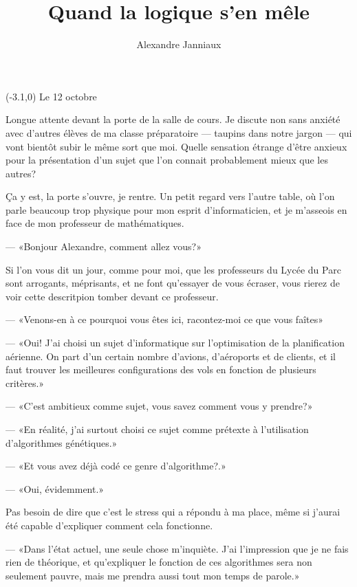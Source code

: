 \documentclass[letterpaper, 12pt]{report} %
\title{Quand la logique s'en mêle}
\author{Alexandre Janniaux}
\newcommand{\datemarge}[1]{%
    \begin{textblock}{3}(-3.1,0)
        #1
    \end{textblock}
}
\begin{document}
  \doublespacing{}

  \maketitle

  
  
  {
      \vspace{0pt}%
      \datemarge{Le 12 octobre}
Longue attente devant la porte de la salle de cours. 
Je discute non sans anxiété avec d'autres élèves de ma classe préparatoire --- taupins dans notre jargon --- qui vont bientôt subir le même sort que moi.
Quelle sensation étrange d'être anxieux pour la présentation d'un sujet que l'on connait probablement mieux que les autres?

Ça y est, la porte s'ouvre, je rentre. Un petit regard vers l'autre table, où l'on parle beaucoup trop physique pour mon esprit d'informaticien, et je m'asseois en face de mon professeur de mathématiques.

--- «Bonjour Alexandre, comment allez vous?»

Si l'on vous dit un jour, comme pour moi, que les professeurs du Lycée du Parc sont arrogants, méprisants, et ne font qu'essayer de vous écraser, vous rierez de voir cette descritpion tomber devant ce professeur.


--- «Venons-en à ce pourquoi vous êtes ici, racontez-moi ce que vous faîtes»

--- «Oui! J'ai choisi un sujet d'informatique sur l'optimisation de la planification aérienne. On part d'un certain nombre d'avions, d'aéroports et de clients, et il faut trouver les meilleures configurations des vols en fonction de plusieurs critères.»

--- «C'est ambitieux comme sujet, vous savez comment vous y prendre?» %

--- «En réalité, j'ai surtout choisi ce sujet comme prétexte à l'utilisation d'algorithmes génétiques.»

--- «Et vous avez déjà codé ce genre d'algorithme?.»

--- «Oui, évidemment.»

Pas besoin de dire que c'est le stress qui a répondu à ma place, même si j'aurai été capable d'expliquer comment cela fonctionne. 

--- «Dans l'état actuel, une seule chose m'inquiète. 
		J'ai l'impression que je ne fais rien de théorique, et qu'expliquer le fonction de ces algorithmes sera non seulement pauvre, mais me prendra aussi tout mon temps de parole.»

}
\end{document}
